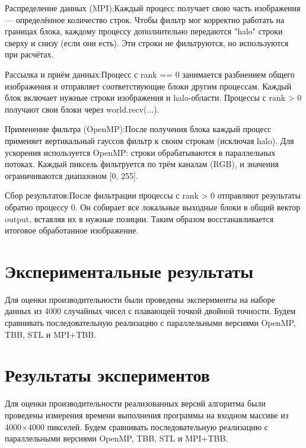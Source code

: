 \documentclass[12pt]{article}
\begin{document}
Распределение данных (MPI):Каждый процесс получает свою часть изображения — определённое количество строк. Чтобы фильтр мог корректно работать на границах блока, каждому процессу дополнительно передаются "halo" строки сверху и снизу (если они есть). Эти строки не фильтруются, но используются при расчётах.

Рассылка и приём данных:Процесс с rank == 0 занимается разбиением общего изображения и отправляет соответствующие блоки другим процессам. Каждый блок включает нужные строки изображения и halo-области. Процессы с rank > 0 получают свои блоки через world.recv(...).

Применение фильтра (OpenMP):После получения блока каждый процесс применяет вертикальный гауссов фильтр к своим строкам (исключая halo). Для ускорения используется OpenMP: строки обрабатываются в параллельных потоках. Каждый пиксель фильтруется по трём каналам (RGB), и значения ограничиваются диапазоном [0, 255].

Сбор результатов:После фильтрации процессы с rank > 0 отправляют результаты обратно процессу 0. Он собирает все локальные выходные блоки в общий вектор output, вставляя их в нужные позиции. Таким образом восстанавливается итоговое обработанное изображение.

\section{Экспериментальные результаты}
Для оценки производительности были проведены эксперименты на наборе данных из 4000 случайных чисел с плавающей точкой двойной точности. Будем сравнивать последовательную реализацию с параллельными версиями OpenMP, TBB, STL и MPI+TBB.

\section*{Результаты экспериментов}
Для оценки производительности реализованных версий алгоритма были проведены измерения времени выполнения программы на входном массиве из 4000×4000 пикселей. Будем сравнивать последовательную реализацию с параллельными версиями OpenMP, TBB, STL и MPI+TBB.
\end{document}
